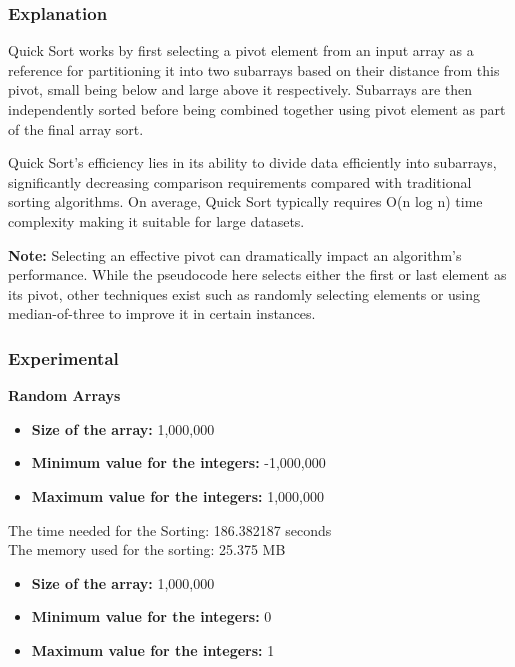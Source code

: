 \documentclass{article}
\begin{document}
\subsubsection{Explanation}

Quick Sort works by first selecting a pivot element from an input array as a reference for partitioning it into two subarrays based on their distance from this pivot, small being below and large above it respectively. Subarrays are then independently sorted before being combined together using pivot element as part of the final array sort.

Quick Sort's efficiency lies in its ability to divide data efficiently into subarrays, significantly decreasing comparison requirements compared with traditional sorting algorithms. On average, Quick Sort typically requires O(n log n) time complexity making it suitable for large datasets.

\textbf{Note:} Selecting an effective pivot can dramatically impact an algorithm's performance. While the pseudocode here selects either the first or last element as its pivot, other techniques exist such as randomly selecting elements or using median-of-three to improve it in certain instances.

\subsubsection{Experimental}

\textbf{Random Arrays}

\begin{itemize}
    \item \textbf{Size of the array:} 1,000,000
    \item \textbf{Minimum value for the integers:} -1,000,000
    \item \textbf{Maximum value for the integers:} 1,000,000
\end{itemize}

The time needed for the Sorting: 186.382187 seconds \\
The memory used for the sorting: 25.375 MB


\begin{itemize}
    \item \textbf{Size of the array:} 1,000,000
    \item \textbf{Minimum value for the integers:} 0
    \item \textbf{Maximum value for the integers:} 1
\end{itemize}
\end{document}

